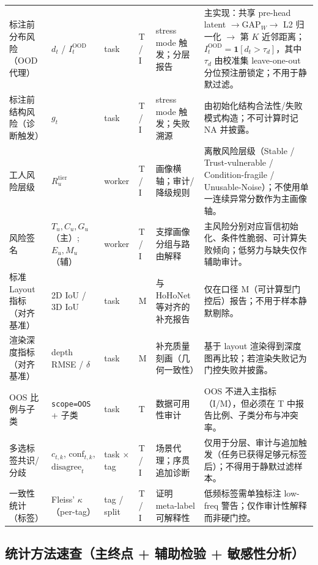 \begin{longtable}{p{3cm} p{2.5cm} p{2cm} p{1.5cm} p{3cm} p{3.5cm}}
标注前分布风险（OOD 代理） & $d_t$ / $I_t^{\mathrm{OOD}}$ & task & T / I & stress mode 触发；分层报告 & 主实现：共享 pre-head latent $\rightarrow \mathrm{GAP}_W \rightarrow$ L2 归一化 $\rightarrow$ 第 $K$ 近邻距离；$I_t^{\mathrm{OOD}}=\mathbf{1}[d_t>\tau_d]$，其中 $\tau_d$ 由校准集 leave-one-out 分位预注册锁定；不用于静默过滤。\\
标注前结构风险（诊断触发） & $g_t$ & task & T / I & stress mode 触发；失败溯源 & 由初始化结构合法性/失败模式构造；不可计算时记 NA 并披露。\\
工人风险层级 & $R_u^{\mathrm{tier}}$ & worker & T / I & 画像横轴；审计/降级规则 & 离散风险层级（Stable / Trust-vulnerable / Condition-fragile / Unusable-Noise）；不使用单一连续异常分数作为主画像轴。\\
风险签名 & $T_u,C_u,G_u$（主）; $E_u,M_u$（辅） & worker & T / I & 支撑画像分组与路由解释 & 主风险分别对应盲信初始化、条件性脆弱、可计算失败倾向；低努力与缺失仅作辅助审计。\\
标准 Layout 指标（对齐基准） & 2D IoU / 3D IoU & task & M & 与 HoHoNet 等对齐的补充报告 & 仅在口径 M（可计算型门控后）报告；不用于样本静默剔除。\\
渲染深度指标（对齐基准） & depth RMSE / $\delta$ & task & M & 补充质量刻画（几何一致性） & 基于 layout 渲染得到深度图再比较；若渲染失败记为门控失败并披露。\\
OOS 比例与子类 & \texttt{scope=OOS} + 子类 & task & T & 数据可用性审计 & OOS 不进入主指标（I/M），但必须在 T 中报告比例、子类分布与冲突率。\\
多选标签共识/分歧 & $c_{t,k}$, $\mathrm{conf}_{t,k}$, $\mathrm{disagree}_t$ & task $\times$ tag & T / I & 场景代理；序贯追加诊断 & 仅用于分层、审计与追加触发（任务已获得足够元标签后）；不得用于静默过滤样本。\\
一致性统计（标签） & Fleiss' $\kappa$（per-tag） & tag / split & T / I & 证明 meta-label 可解释性 & 低频标签需单独标注 low-freq 警告；仅作审计性解释而非硬门控。\\

\end{longtable}
\FloatBarrier

\subsection{统计方法速查（主终点 + 辅助检验 + 敏感性分析）}

